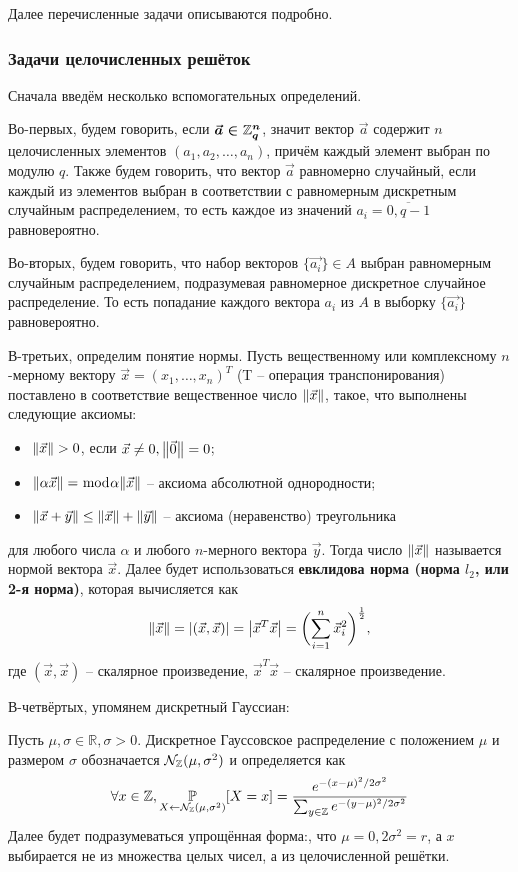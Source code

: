 Далее перечисленные задачи описываются подробно.
\subsubsection{Задачи целочисленных решёток}

Сначала введём несколько вспомогательных определений.

Во-первых, будем говорить, если $\vb*{\vec{a} \in \mathbb{Z}_q^n}$, значит вектор $\vec{a}$ содержит $n$ целочисленных элементов $(a_1, a_2, \ldots, a_n)$, причём каждый элемент выбран по модулю $q$. Также будем говорить, что вектор $\vec{a}$ равномерно случайный, если каждый из элементов выбран в соответствии с равномерным дискретным случайным распределением, то есть каждое из значений $a_i=\overline{0, q-1}$ равновероятно.

Во-вторых, будем говорить, что набор векторов $\{\vec{a_i}\} \in A$ выбран равномерным случайным распределением, подразумевая равномерное дискретное случайное распределение. То есть попадание каждого вектора $a_i$ из $A$ в выборку $\{\vec{a_i}\}$ равновероятно.

В-третьих, определим понятие $\textbf{нормы}$\cite{vec_norm}. Пусть вещественному или комплексному $n$-мерному вектору $\vec{x} = (x_1 , \ldots, x_n)^T$ (T -- операция транспонирования) поставлено в соответствие вещественное число $\norm{\vec{x}}$, такое, что выполнены следующие аксиомы:
\begin{itemize}
    \item $\norm{\vec{x}} > 0$, если $\vec{x} \neq 0, \norm{\vec{0}} = 0$;
    \item $\norm{\alpha \vec{x}} = \bmod{\alpha} \norm{\vec{x}}$ -- аксиома абсолютной однородности;
    \item $\norm{\vec{x}+\vec{y}} \leq \norm{\vec{x}} + \norm{\vec{y}}$ -- аксиома (неравенство) треугольника
\end{itemize}
для любого числа $\alpha$ и любого $n$-мерного вектора $\vec{y}$. Тогда число $\norm{\vec{x}}$ называется нормой вектора $\vec{x}$. Далее будет использоваться \textbf{евклидова норма (норма $l_2$, или 2-я норма)}, которая вычисляется как
\[
\norm{\vec{x}}=\abs{(\vec{x},\vec{x})}=\abs{\vec{x}^T\vec{x}}=\biggl( \sum_{i=1}^{n}\vec{x}_i^2 \biggr)^{\frac{1}{2}},
\]
где $(\vec{x},\vec{x})$ -- скалярное произведение, $\vec{x}^T\vec{x}$ -- скалярное произведение.

В-четвёртых, упомянем дискретный Гауссиан:
\begin{definition}
Пусть $\mu,\sigma \in \mathbb{R}, \sigma > 0$. Дискретное Гауссовское распределение с положением $\mu$ и размером $\sigma$ обозначается ${\cal N_{\mathbb{Z}}} (\mu,\sigma^2)$ и определяется как
\[
\forall x \in \mathbb{Z}, \underset{X\leftarrow {\cal N_{\mathbb{Z}}} (\mu, \sigma^{2} )}{\mathbb{P}} [X=x] = \frac{e^{-(x-\mu)^2/2\sigma^2}}{\sum_{y\in \mathbb{Z}} e^{-(y-\mu)^2/2\sigma^2}}
\]
Далее будет подразумеваться упрощённая форма:, что $\mu = 0, 2\sigma^2 = r$, а $x$ выбирается не из множества целых чисел, а из целочисленной решётки. \cite{Discrete_Gaussian}
\end{definition}

